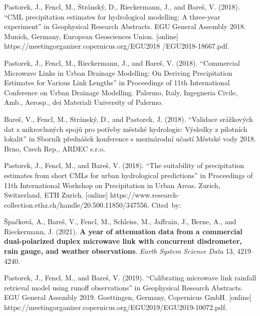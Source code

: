 \documentclass{ctuthesis}\usepackage[]{graphicx}\usepackage[]{color}
\begin{document}
\begin{description}
\item Pastorek, J., Fencl, M., Stránský, D., Rieckermann, J., and Bareš, V. (2018). “CML precipitation estimates for hydrological modelling: A three-year experiment” in Geophysical Research Abstracts. EGU General Assembly 2018. Munich, Germany, European Geosciences Union. [online] \newline https://meetingorganizer.copernicus.org/EGU2018 /EGU2018-18667.pdf.

\item Pastorek, J., Fencl, M., Rieckermann, J., and Bareš, V. (2018). “Commercial Microwave Links in Urban Drainage Modelling: On Deriving Precipitation Estimates for Various Link Lengths” in Proceedings of 11th International Conference on Urban Drainage Modelling. Palermo, Italy, Ingegneria Civile, Amb., Aerosp., dei Materiali University of Palermo.

\item Bareš, V., Fencl, M., Stránský, D., and Pastorek, J. (2018). “Validace srážkových dat z  mikrovlnných spojů pro potřeby městské hydrologie: Výsledky z pilotních lokalit” in Sborník přednášek konference s mezinárodní učastí Městské vody 2018. Brno, Czech Rep., ARDEC s.r.o.

\item Pastorek, J., Fencl, M., and Bareš, V. (2018). “The suitability of precipitation estimates from short CMLs for urban hydrological predictions” in Proceedings of 11th International Workshop on Precipitation in Urban Areas. Zurich, Switzerland, ETH Zurich. [online] \newline https://www.research-collection.ethz.ch/handle/20.500.11850/347556.
Cited~by:
        \begin{description}
                \item Špačková, A., Bareš, V., Fencl, M., Schleiss, M., Jaffrain, J., Berne, A., and Rieckermann, J. (2021). \textbf{A year of attenuation data from a commercial dual-polarized duplex microwave link with concurrent disdrometer, rain gauge, and weather observations}.  \emph{Earth System Science Data} 13, 4219--4240.
        \end{description}

\item Pastorek, J., Fencl, M., and Bareš, V. (2019). “Calibrating microwave link rainfall retrieval model using runoff observations” in Geophysical Research Abstracts. EGU General Assembly 2019. Goettingen, Germany, Copernicus GmbH. [online] \newline https://meetingorganizer.copernicus.org/EGU2019/EGU2019-10072.pdf.


\end{description}
\end{document}
